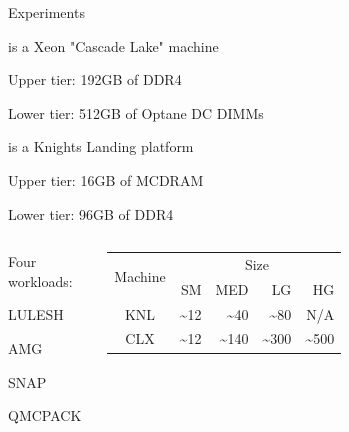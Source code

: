 \documentclass[final,hyperref={pdfpagelabels=false}]{beamer}
\begin{document}
\begin{frame}{Experiments}
  \begin{customlist}{0em}{0em}
    \item {} is a Xeon "Cascade Lake" machine
    \begin{customlist}{1em}{0em}
      \item Upper tier: 192GB of DDR4
      \item Lower tier: 512GB of Optane DC DIMMs
    \end{customlist}
    \item {} is a Knights Landing platform
    \begin{customlist}{1em}{0em}
      \item Upper tier: 16GB of MCDRAM
      \item Lower tier: 96GB of DDR4
    \end{customlist}
  \end{customlist}

  \vspace{1em}

  \begin{minipage}{\paperwidth}
  \begin{columns}[T,onlytextwidth]%
    \begin{customlist}{0em}{0em}
      \item Four workloads:
      \begin{customlist}{1em}{0em}
        \item LULESH
        \item AMG
        \item SNAP
        \item QMCPACK
      \end{customlist}
    \end{customlist}
    \centering
    \begin{table}[t]
      \centering
      \footnotesize
      \begin{tabular}{|c|r|r|r|r|}
        \hline
        \multirow{2}{*}{Machine} &
        \multicolumn{4}{c|}{Size} \\
        \cline{2-5}
        & SM & MED & LG & HG \\
        \hline

        KNL & \textasciitilde12 & \textasciitilde40 & \textasciitilde80 & N/A \\
        \hline
        CLX & \textasciitilde12 & \textasciitilde140 & \textasciitilde300 & \textasciitilde500 \\
        \hline
      \end{tabular}
    \end{table}
  \end{columns}
  \end{minipage}
\end{frame}
\end{document}

